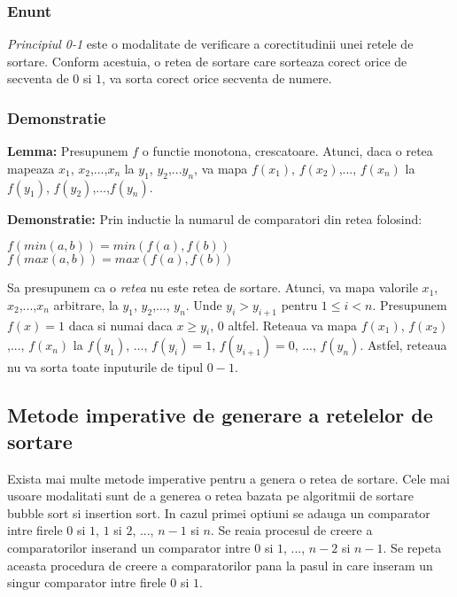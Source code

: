 \documentclass[12pt]{article}
\newenvironment{tightcenter}{%
  \setlength\topsep{0pt}
  \setlength\parskip{0pt}
  \begin{center}
}{%
  \end{center}
}
\begin{document}
\subsubsection{Enunt}
\textit{Principiul 0-1} este o modalitate de verificare a corectitudinii unei retele de sortare. Conform acestuia, o retea de sortare care sorteaza corect orice de secventa de $0$ si $1$, va sorta corect orice secventa de numere.

\subsubsection{Demonstratie}
\textbf{Lemma:} Presupunem $f$ o functie monotona, crescatoare. Atunci, daca o retea mapeaza $x_1$, $x_2$,...,$x_n$ la $y_1$, $y_2$,...$y_n$, va mapa $f(x_1)$, $f(x_2)$,..., $f(x_n)$ la $f(y_1)$, $f(y_2)$,...,$f(y_n)$. 

\textbf{Demonstratie:} Prin inductie la numarul de comparatori din retea folosind:
\begin{tightcenter} 
 $f(min(a, b)) = min(f(a), f(b))$\\
 $f(max(a, b)) = max(f(a), f(b))$\\
\end{tightcenter}

Sa presupunem ca o \textit{retea} nu este retea de sortare. Atunci, va mapa valorile $x_1$, $x_2$,...,$x_n$ arbitrare, la $y_1$, $y_2$,..., $y_n$. Unde $y_i > y_{i+1}$ pentru $1 \leq i  < n$. Presupunem $f(x) = 1$ daca si numai daca $x \geq y_i$, $0$ altfel. Reteaua va mapa $f(x_1)$, $f(x_2)$,..., $f(x_n)$ la $f(y_1)$, ..., $f(y_i)=1$, $f(y_{i+1})=0$, ..., $f(y_n)$. Astfel, reteaua nu va sorta toate inputurile de tipul $0-1$.


\subsection{Metode imperative de generare a retelelor de sortare}

Exista mai multe metode imperative pentru a genera o retea de sortare. Cele mai usoare modalitati sunt de a generea o 
retea bazata pe algoritmii de sortare bubble sort si insertion sort. In cazul primei optiuni se adauga un comparator intre
firele $0$ si $1$, $1$ si $2$, ..., $n-1$ si $n$. Se reaia procesul de creere a comparatorilor inserand un comparator intre $0$ si $1$, ..., $n-2$ si $n-1$. Se repeta aceasta procedura de creere a comparatorilor pana la pasul in care inseram un singur comparator intre firele $0$ si $1$.
\end{document}
